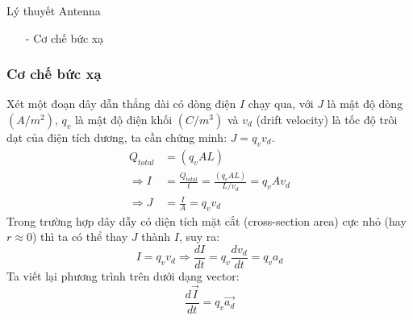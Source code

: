 \documentclass[8pt]{beamer}
\begin{document}
\begin{frame}{Lý thuyết Antenna}
\begin{itemize}
\item[-] Cơ chế bức xạ
\end{itemize}
\subsubsection{Cơ chế bức xạ}
Xét một đoạn dây dẫn thẳng dài có dòng điện $I$ chạy qua, với $J$ là mật độ dòng $(A/m^2)$, $q_{v}$ là mật độ điện khối $(C/m^3)$ và $v_{d}$ (drift velocity) là tốc độ trôi dạt của điện tích dương, ta cần chứng minh: $J=q_{v}v_{d}$.
\begin{equation*}
\begin{split}
	Q_{total}&=(q_{v}AL) \\
	\Rightarrow I&=\frac{Q_{total}}{t}=\frac{(q_{v}AL)}{L/v_{d}}=q_{v}Av_{d}\\
	\Rightarrow J&=\frac{I}{A}=q_{v}v_{d}
\end{split}
	\end{equation*}
Trong trường hợp dây dẫy có diện tích mặt cắt (cross-section area) cực nhỏ (hay $r\approx 0$) thì ta có thể thay $J$ thành $I$, suy ra:
$$I=q_{v}v_{d}\Rightarrow \frac{dI}{dt}=q_{v}\frac{dv_{d}}{dt}=q_{v}a_{d}$$
Ta viết lại phương trình trên dưới dạng vector:
$$\frac{d\overrightarrow{I}}{dt}=q_{v}\overrightarrow{a_{d}}$$
\end{frame}
\end{document}
